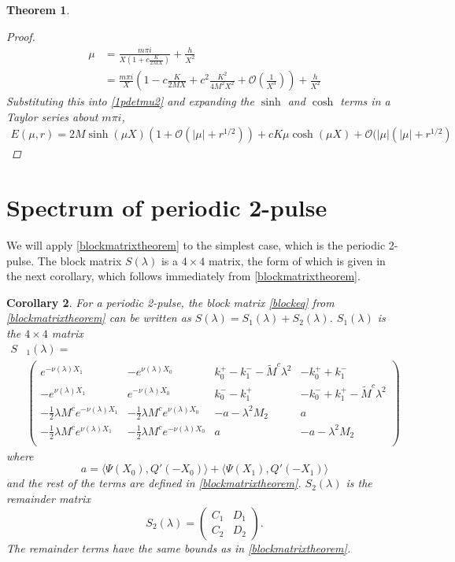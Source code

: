 \documentclass[11pt,reqno]{amsart}
\theoremstyle{plain}
\newtheorem{theorem}{Theorem}
\newtheorem{corollary}[theorem]{Corollary}
\theoremstyle{definition}
\theoremstyle{remark}
\begin{document}
\begin{theorem}
\begin{proof}
\begin{align*}
\mu &= \frac{m \pi i}{X\left(1  + c \frac{K}{2 M X} \right) } + \frac{h}{X^2}\\
&= \frac{m \pi i}{X}\left( 1 - c \frac{K}{2 M X} + c^2 \frac{K^2}{4 M^2 X^2} + \mathcal{O}\left(\frac{1}{X^3}\right) \right) + \frac{h}{X^2}
\end{align*}
Substituting this into \cref{1pdetmu2} and expanding the $\sinh$ and $\cosh$ terms in a Taylor series about $m \pi i$,
\begin{align*}
E(\mu, r) = 2 M \sinh(\mu X)(1 + \mathcal{O}(|\mu| + r^{1/2})) + c K \mu \cosh(\mu X) + \mathcal{O}(|\mu|(|\mu| + r^{1/2})
\end{align*}
\end{proof}
\end{theorem}




\section{Spectrum of periodic 2-pulse}\label{sec:per2peig}

We will apply \cref{blockmatrixtheorem} to the simplest case, which is the periodic 2-pulse. The block matrix $S(\lambda)$ is a $4\times 4$ matrix, the form of which is given in the next corollary, which follows immediately from \cref{blockmatrixtheorem}.

\begin{corollary}\label{corr:2blockmatrix}
For a periodic 2-pulse, the block matrix \cref{blockeq} from \cref{blockmatrixtheorem} can be written as $S(\lambda) = S_1(\lambda) + S_2(\lambda)$. $S_1(\lambda)$ is the $4 \times 4$ matrix
\begin{align}
S&_1(\lambda) = \\
&\begin{pmatrix}
e^{-\nu(\lambda)X_1} & -e^{\nu(\lambda)X_0} & k_0^+ - k_1^- -\tilde{M}^c \lambda^2 & -k_0^+ + k_1^- \\
-e^{\nu(\lambda)X_1} & e^{-\nu(\lambda)X_0} & k_0^- - k_1^+ & -k_0^- + k_1^+-\tilde{M}^c \lambda^2 \\
-\frac{1}{2}\lambda M^c e^{-\nu(\lambda)X_1} & -\frac{1}{2}\lambda M^ce^{\nu(\lambda)X_0} &-a-\lambda^2 M_2 & a \\
-\frac{1}{2}\lambda M^c e^{\nu(\lambda)X_1} & -\frac{1}{2}\lambda M^c e^{-\nu(\lambda)X_0}  & a & -a-\lambda^2 M_2 \\
\end{pmatrix}
\end{align}
where
\begin{equation}\label{2pa}
a = \langle \Psi(X_0), Q'(-X_0) \rangle + \langle \Psi(X_1), Q'(-X_1) \rangle
\end{equation}
and the rest of the terms are defined in \cref{blockmatrixtheorem}. $S_2(\lambda)$ is the remainder matrix
\[
S_2(\lambda) = \begin{pmatrix} C_1 & D_1 \\ C_2 & D_2 \end{pmatrix}.
\]
The remainder terms have the same bounds as in \cref{blockmatrixtheorem}.
\end{corollary}
\end{document}
